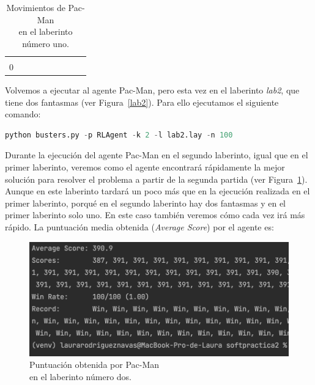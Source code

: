 \documentclass[11pt]{exam}
\begin{document}
\begin{table}[H]
\begin{tabular}{ccccccccc}
		\multicolumn{1}{c|}{} &
		\multicolumn{1}{c|}{\cellcolor[HTML]{000000}} \\ \cline{2-9} 
		\multicolumn{1}{c|}{0} &
		\multicolumn{1}{c|}{\cellcolor[HTML]{000000}} &
		\multicolumn{1}{c|}{\cellcolor[HTML]{000000}} &
		\multicolumn{1}{c|}{\cellcolor[HTML]{000000}} &
		\multicolumn{1}{c|}{\cellcolor[HTML]{000000}} &
		\multicolumn{1}{c|}{\cellcolor[HTML]{000000}} &
		\multicolumn{1}{c|}{\cellcolor[HTML]{000000}} &
		\multicolumn{1}{c|}{\cellcolor[HTML]{000000}} &
		\multicolumn{1}{c|}{\cellcolor[HTML]{000000}} \\ \cline{2-9} 
	\end{tabular}
	\caption{Movimientos de Pac-Man \\ en el laberinto número uno.}
	\label{tabla_lab1}
\end{table}

Volvemos a ejecutar al agente Pac-Man, pero esta vez en el laberinto \textit{lab2}, que tiene dos fantasmas (ver Figura~\ref{lab2}). Para ello ejecutamos el siguiente comando:
\vspace*{2mm}

\begin{lstlisting}[language=python, basicstyle=\footnotesize]
python busters.py -p RLAgent -k 2 -l lab2.lay -n 100
\end{lstlisting}
\vspace*{2mm}

Durante la ejecución del agente Pac-Man en el segundo laberinto, igual que en el primer laberinto, veremos como el agente encontrará rápidamente la mejor solución para resolver el problema a partir de la segunda partida (ver Figura~\ref{result_lab2}). Aunque en este laberinto tardará un poco más que en la ejecución realizada en el primer laberinto, porqué en el segundo laberinto hay dos fantasmas y en el primer laberinto solo uno. En este caso también veremos cómo cada vez irá más rápido. La puntuación media obtenida (\textit{Average Score}) por el agente es:
\vspace*{2mm}

\begin{figure}[H]
	\centering
	\includegraphics[scale=0.65]{result_lab2}
	\caption{Puntuación obtenida por Pac-Man \\ en el laberinto número dos.}
	\label{result_lab2}
\end{figure}
\end{document}
